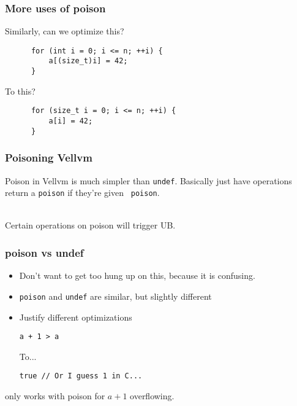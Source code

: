 \documentclass[handout]{beamer}
\begin{document}
\begin{frame}[fragile]
  \frametitle{More uses of poison}
  Similarly, can we optimize this?
  
\begin{lstlisting}
      for (int i = 0; i <= n; ++i) {
          a[(size_t)i] = 42;
      }
\end{lstlisting}

  \pause To this?

\begin{lstlisting}
      for (size_t i = 0; i <= n; ++i) {
          a[i] = 42;
      }
\end{lstlisting}

\end{frame}

\begin{frame}
  \frametitle{Poisoning Vellvm}

  Poison in Vellvm is much simpler than {\tt undef}. Basically just
  have operations return a {\tt poison} if they're given {\tt
    poison}.\\~

  Certain operations on poison will trigger UB.
  
\end{frame}

\begin{frame}[fragile]
  \frametitle{poison vs undef}

  \begin{itemize}
  \item Don't want to get too hung up on this, because it is
    confusing.
  \item {\tt poison} and {\tt undef} are similar, but  slightly
    different
  \item  Justify different optimizations

\begin{lstlisting}
a + 1 > a
\end{lstlisting}

    To...

\begin{lstlisting}
true // Or I guess 1 in C...
\end{lstlisting}
  \end{itemize}

  only works with poison for $a + 1$ overflowing.
\end{frame}
\end{document}
